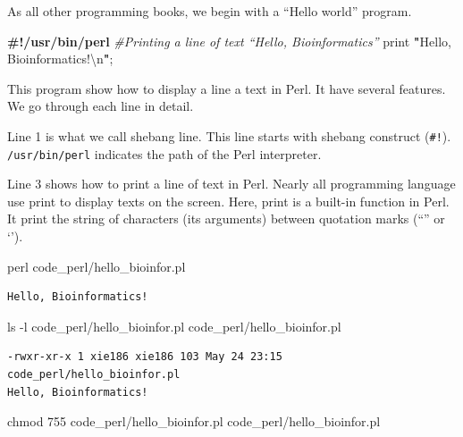 \documentclass[]{book}
\makeatletter
\newenvironment{Shaded}{\begin{snugshade}}{\end{snugshade}}
\newcommand{\KeywordTok}[1]{\textcolor[rgb]{0.13,0.29,0.53}{\textbf{#1}}}
\newcommand{\CharTok}[1]{\textcolor[rgb]{0.31,0.60,0.02}{#1}}
\newcommand{\StringTok}[1]{\textcolor[rgb]{0.31,0.60,0.02}{#1}}
\newcommand{\CommentTok}[1]{\textcolor[rgb]{0.56,0.35,0.01}{\textit{#1}}}
\newcommand{\FunctionTok}[1]{\textcolor[rgb]{0.00,0.00,0.00}{#1}}
\newcommand{\ExtensionTok}[1]{#1}
\newcommand{\NormalTok}[1]{#1}
\newenvironment{kframe}{%
\medskip{}
\setlength{\fboxsep}{.8em}
 \def\at@end@of@kframe{}%
 \ifinner\ifhmode%
  \def\at@end@of@kframe{\end{minipage}}%
  \begin{minipage}{\columnwidth}%
 \fi\fi%
 \def\FrameCommand##1{\hskip\@totalleftmargin \hskip-\fboxsep
 \colorbox{shadecolor}{##1}\hskip-\fboxsep
     \hskip-\linewidth \hskip-\@totalleftmargin \hskip\columnwidth}%
 \MakeFramed {\advance\hsize-\width
   \@totalleftmargin\z@ \linewidth\hsize
   \@setminipage}}%
 {\par\unskip\endMakeFramed%
 \at@end@of@kframe}
\renewenvironment{Shaded}{\begin{kframe}}{\end{kframe}}
\theoremstyle{definition}
\theoremstyle{definition}
\theoremstyle{definition}
\theoremstyle{remark}
\makeatother
\begin{document}
As all other programming books, we begin with a ``Hello world'' program.

\begin{Shaded}
\begin{Highlighting}[]
\KeywordTok{#!/usr/bin/perl}
\CommentTok{#Printing a line of text “Hello, Bioinformatics”}
\FunctionTok{print} \KeywordTok{"}\StringTok{Hello, Bioinformatics!}\CharTok{\textbackslash{}n}\KeywordTok{"}\NormalTok{;}
\end{Highlighting}
\end{Shaded}

This program show how to display a line a text in Perl. It have several
features. We go through each line in detail.

Line 1 is what we call shebang line. This line starts with shebang
construct (\texttt{\#!}). \texttt{/usr/bin/perl} indicates the path of
the Perl interpreter.

Line 3 shows how to print a line of text in Perl. Nearly all programming
language use print to display texts on the screen. Here, print is a
built-in function in Perl. It print the string of characters (its
arguments) between quotation marks (``'' or `').

\begin{Shaded}
\begin{Highlighting}[]
\FunctionTok{perl}\NormalTok{ code_perl/hello_bioinfor.pl}
\end{Highlighting}
\end{Shaded}

\begin{verbatim}
Hello, Bioinformatics!
\end{verbatim}

\begin{Shaded}
\begin{Highlighting}[]
\FunctionTok{ls}\NormalTok{ -l code_perl/hello_bioinfor.pl}
\ExtensionTok{code_perl/hello_bioinfor.pl}
\end{Highlighting}
\end{Shaded}

\begin{verbatim}
-rwxr-xr-x 1 xie186 xie186 103 May 24 23:15 code_perl/hello_bioinfor.pl
Hello, Bioinformatics!
\end{verbatim}

\begin{Shaded}
\begin{Highlighting}[]
\FunctionTok{chmod}\NormalTok{ 755 code_perl/hello_bioinfor.pl}
\ExtensionTok{code_perl/hello_bioinfor.pl}
\end{Highlighting}
\end{Shaded}
\end{document}
